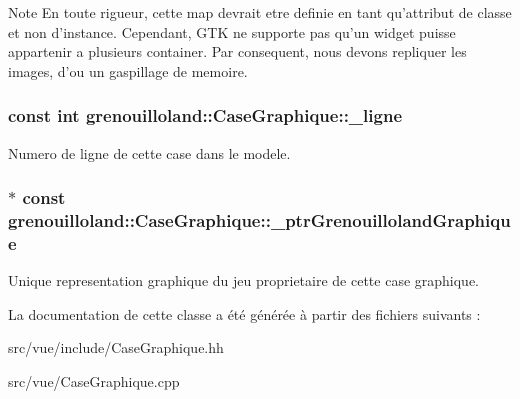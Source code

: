 \begin{DoxyNote}{Note}
En toute rigueur, cette map devrait etre definie en tant qu'attribut de classe et non d'instance. Cependant, G\-T\-K ne supporte pas qu'un widget puisse appartenir a plusieurs container. Par consequent, nous devons repliquer les images, d'ou un gaspillage de memoire. 
\end{DoxyNote}
\hypertarget{classgrenouilloland_1_1CaseGraphique_a66f59a2fcbc16ffda0bd1e30471737f3}{
\subsubsection[{\-\_\-ligne}]{\setlength{\rightskip}{0pt plus 5cm}const int grenouilloland\-::\-Case\-Graphique\-::\-\_\-ligne\hspace{0.3cm}{\ttfamily [protected]}}}\label{classgrenouilloland_1_1CaseGraphique_a66f59a2fcbc16ffda0bd1e30471737f3}
Numero de ligne de cette case dans le modele. \hypertarget{classgrenouilloland_1_1CaseGraphique_a0ef536735e07c4f90f32afa4b74928d3}{
\subsubsection[{\-\_\-ptr\-Grenouilloland\-Graphique}]{$\ast$ const grenouilloland\-::\-Case\-Graphique\-::\-\_\-ptr\-Grenouilloland\-Graphique\hspace{0.3cm}{\ttfamily [protected]}}}\label{classgrenouilloland_1_1CaseGraphique_a0ef536735e07c4f90f32afa4b74928d3}
Unique representation graphique du jeu proprietaire de cette case graphique. 

La documentation de cette classe a été générée à partir des fichiers suivants \-:\begin{DoxyCompactItemize}
\item 
src/vue/include/Case\-Graphique.\-hh\item 
src/vue/Case\-Graphique.\-cpp\end{DoxyCompactItemize}
